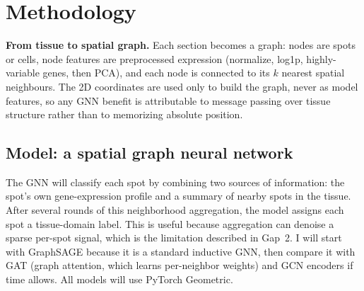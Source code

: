 \documentclass[11pt]{article}
\begin{document}
\section{Methodology}

\textbf{From tissue to spatial graph.} Each section becomes a graph: nodes are
spots or cells, node features are preprocessed expression (normalize, log1p,
highly-variable genes, then PCA), and each node is connected to its $k$ nearest
spatial neighbours. The 2D coordinates are used only to build the graph, never as
model features, so any GNN benefit is attributable to message passing over tissue
structure rather than to memorizing absolute position.

\subsection{Model: a spatial graph neural network}
The GNN will classify each spot by combining two sources of information: the
spot's own gene-expression profile and a summary of nearby spots in the tissue.
After several rounds of this neighborhood aggregation, the model assigns each
spot a tissue-domain label. This is useful because aggregation can denoise a
sparse per-spot signal, which is the limitation described in Gap~2. I will start
with GraphSAGE because it is a standard inductive GNN, then compare it with GAT
(graph attention, which learns per-neighbor weights) and GCN encoders if time
allows. All models will use PyTorch Geometric.
\end{document}

